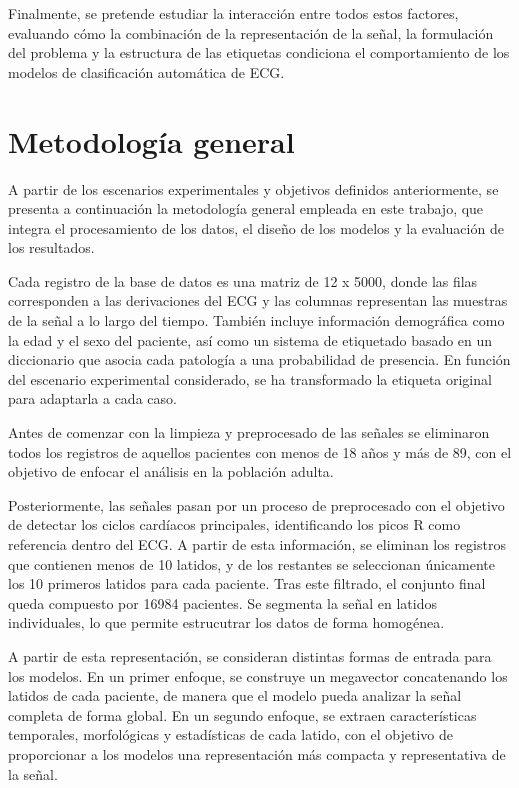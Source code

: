 \documentclass[12pt,a4paper,twoside]{book}
\begin{document}
Finalmente, se pretende estudiar la interacción entre todos estos factores, evaluando cómo la combinación de la representación de la señal, la formulación del problema y la estructura de las etiquetas condiciona el comportamiento de los modelos de clasificación automática de ECG.

\section{Metodología general}

A partir de los escenarios experimentales y objetivos definidos anteriormente, se presenta a continuación la metodología general empleada en este trabajo, que integra el procesamiento de los datos, el diseño de los modelos y la evaluación de los resultados.

Cada registro de la base de datos es una matriz de 12 x 5000, donde las filas corresponden a las derivaciones del ECG y las columnas representan las muestras de la señal a lo largo del tiempo.
También incluye información demográfica como la edad y el sexo del paciente, así como un sistema de etiquetado basado en un diccionario que asocia cada patología a una probabilidad de presencia.
En función del escenario experimental considerado, se ha transformado la etiqueta original para adaptarla a cada caso.

Antes de comenzar con la limpieza y preprocesado de las señales se eliminaron todos los registros de aquellos pacientes con menos de 18 años y más de 89, con el objetivo de enfocar el análisis en la población adulta.

Posteriormente, las señales pasan por un proceso de preprocesado con el objetivo de detectar los ciclos cardíacos principales, identificando los picos R como referencia dentro del ECG. 
A partir de esta información, se eliminan los registros que contienen menos de 10 latidos, y de los restantes se seleccionan únicamente los 10 primeros latidos para cada paciente.
Tras este filtrado, el conjunto final queda compuesto por 16984 pacientes.
Se segmenta la señal en latidos individuales, lo que permite estrucutrar los datos de forma homogénea. 

A partir de esta representación, se consideran distintas formas de entrada para los modelos. 
En un primer enfoque, se construye un megavector concatenando los latidos de cada paciente, de manera que el modelo pueda analizar la señal completa de forma global.
En un segundo enfoque, se extraen características temporales, morfológicas y estadísticas de cada latido, con el objetivo de proporcionar a los modelos una representación más compacta y representativa de la señal.
\end{document}
